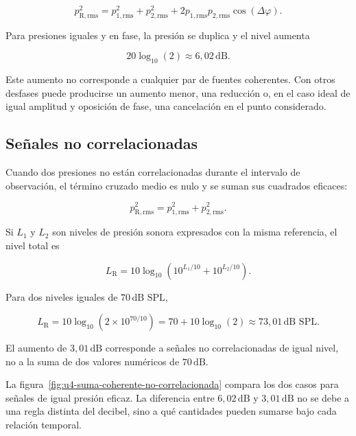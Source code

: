 \begin{equation}
    p_{\mathrm{R,rms}}^2
      =p_{1,\mathrm{rms}}^2+p_{2,\mathrm{rms}}^2
       +2p_{1,\mathrm{rms}}p_{2,\mathrm{rms}}
        \cos(\Delta\varphi).
    \label{eq:u4-suma-coherente}
\end{equation}

Para presiones iguales y en fase, la presión se duplica y el nivel aumenta

\[
    20\log_{10}(2)\approx6{,}02\,\text{dB}.
\]

Este aumento no corresponde a cualquier par de fuentes coherentes. Con otros
desfases puede producirse un aumento menor, una reducción o, en el caso ideal
de igual amplitud y oposición de fase, una cancelación en el punto considerado.

\subsection{Señales no correlacionadas}
\label{sec:u4-fuentes-no-correlacionadas}

Cuando dos presiones no están correlacionadas durante el intervalo de
observación, el término cruzado medio es nulo y se suman sus cuadrados
eficaces:

\begin{equation}
    p_{\mathrm{R,rms}}^2
      =p_{1,\mathrm{rms}}^2+p_{2,\mathrm{rms}}^2.
    \label{eq:u4-suma-no-correlacionada}
\end{equation}

Si \(L_1\) y \(L_2\) son niveles de presión sonora expresados con la misma
referencia, el nivel total es

\begin{equation}
    L_\mathrm{R}
      =10\log_{10}\!\left(
        10^{L_1/10}+10^{L_2/10}\right).
    \label{eq:u4-suma-niveles}
\end{equation}

Para dos niveles iguales de \(70\,\text{dB SPL}\),

\[
    L_\mathrm{R}
      =10\log_{10}\!\left(
        2\times10^{70/10}\right)
      =70+10\log_{10}(2)
      \approx73{,}01\,\text{dB SPL}.
\]

El aumento de \(3{,}01\,\text{dB}\) corresponde a señales no correlacionadas
de igual nivel, no a la suma de dos valores numéricos de \(70\,\text{dB}\).

La figura~\ref{fig:u4-suma-coherente-no-correlacionada} compara los dos casos
para señales de igual presión eficaz. La diferencia entre \(6{,}02\,\text{dB}\)
y \(3{,}01\,\text{dB}\) no se debe a una regla distinta del decibel, sino a
qué cantidades pueden sumarse bajo cada relación temporal.

